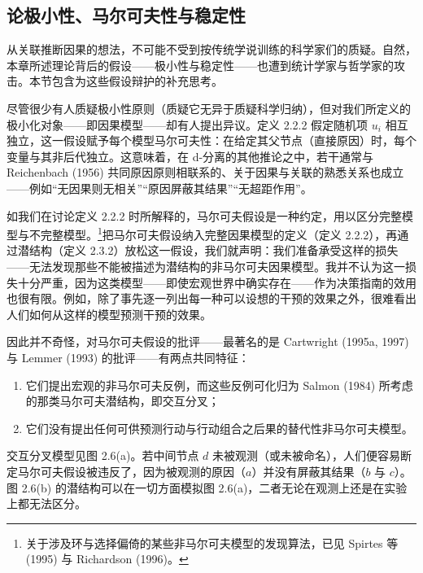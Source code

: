 \subsection{论极小性、马尔可夫性与稳定性}

从关联推断因果的想法，不可能不受到按传统学说训练的科学家们的质疑。自然，本章所述理论背后的假设——极小性与稳定性——也遭到统计学家与哲学家的攻击。本节包含为这些假设辩护的补充思考。

尽管很少有人质疑极小性原则（质疑它无异于质疑科学归纳），但对我们所定义的极小化对象——即因果模型——却有人提出异议。定义 2.2.2 假定随机项 $u_i$ 相互独立，这一假设赋予每个模型马尔可夫性：在给定其父节点（直接原因）时，每个变量与其非后代独立。这意味着，在 d-分离的其他推论之中，若干通常与 Reichenbach (1956) 共同原因原则相联系的、关于因果与关联的熟悉关系也成立——例如“无因果则无相关”“原因屏蔽其结果”“无超距作用”。

如我们在讨论定义 2.2.2 时所解释的，马尔可夫假设是一种约定，用以区分完整模型与不完整模型。\footnote{关于涉及环与选择偏倚的某些非马尔可夫模型的发现算法，已见 Spirtes 等 (1995) 与 Richardson (1996)。}把马尔可夫假设纳入完整因果模型的定义（定义 2.2.2），再通过潜结构（定义 2.3.2）放松这一假设，我们就声明：我们准备承受这样的损失——无法发现那些不能被描述为潜结构的非马尔可夫因果模型。我并不认为这一损失十分严重，因为这类模型——即使宏观世界中确实存在——作为决策指南的效用也很有限。例如，除了事先逐一列出每一种可以设想的干预的效果之外，很难看出人们如何从这样的模型预测干预的效果。

因此并不奇怪，对马尔可夫假设的批评——最著名的是 Cartwright (1995a, 1997) 与 Lemmer (1993) 的批评——有两点共同特征：
\begin{enumerate}[label=\arabic*.,leftmargin=1.8em]
\item 它们提出宏观的非马尔可夫反例，而这些反例可化归为 Salmon (1984) 所考虑的那类马尔可夫潜结构，即交互分叉；
\item 它们没有提出任何可供预测行动与行动组合之后果的替代性非马尔可夫模型。
\end{enumerate}

交互分叉模型见图 2.6(a)。若中间节点 $d$ 未被观测（或未被命名），人们便容易断定马尔可夫假设被违反了，因为被观测的原因（$a$）并没有屏蔽其结果（$b$ 与 $c$）。图 2.6(b) 的潜结构可以在一切方面模拟图 2.6(a)，二者无论在观测上还是在实验上都无法区分。

